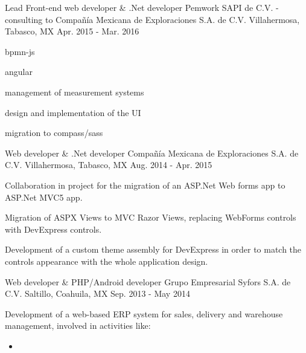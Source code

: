 \begin{cventries}

\cventry
{Lead Front-end web developer \& .Net developer} %
{Pemwork SAPI de C.V. - consulting to Compañía Mexicana de Exploraciones S.A. de C.V.} %
{Villahermosa, Tabasco, MX} %
{Apr. 2015 - Mar. 2016} %
{ %
	\begin{cvitems}
		\item{bpmn-js}
		\item{angular}
		\item{management of measurement systems}
		\item{design and implementation of the UI}
		\item{migration to compass/sass}
	\end{cvitems}
}


\cventry
{Web developer \& .Net developer} %
{Compañía Mexicana de Exploraciones S.A. de C.V.} %
{Villahermosa, Tabasco, MX} %
{Aug. 2014 - Apr. 2015} %
{ %
	\begin{cvitems}
		\item {Collaboration in project for the migration of an ASP.Net Web forms app to ASP.Net MVC5 app.}
		\item {Migration of ASPX Views to MVC Razor Views, replacing WebForms controls with DevExpress controls.}
		\item {Development of a custom theme assembly for DevExpress in order to match the controls appearance with the whole application design.}
	\end{cvitems}
}


\cventry
{Web developer \& PHP/Android developer} %
{Grupo Empresarial Syfors S.A. de C.V.} %
{Saltillo, Coahuila, MX} %
{Sep. 2013 - May 2014} %
{ %
	\begin{cvitems}
		\item {Development of a web-based ERP system for sales, delivery and warehouse management, involved in activities like:}
		\begin{itemize}
			\item {}
		\end{itemize}
	\end{cvitems} 
}


\end{cventries}
